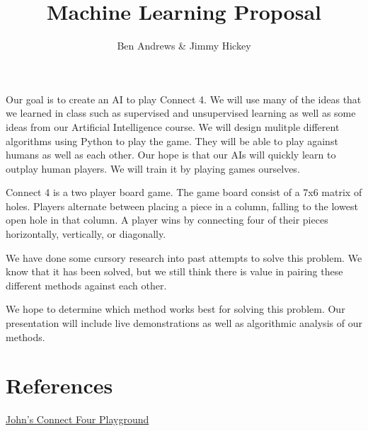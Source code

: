 \documentclass[]{article}
\title{Machine Learning Proposal}
\author{Ben Andrews \& Jimmy Hickey}
\begin{document}
	\maketitle

Our goal is to create an AI to play Connect 4. We will use many of the ideas that we learned in class such as supervised and unsupervised learning as well as some ideas from our Artificial Intelligence course. We will design mulitple different algorithms using Python to play the game. They will be able to play against humans as well as each other. Our hope is that our AIs will quickly learn to outplay human players. We will train it by playing games ourselves.

Connect 4 is a two player board game. The game board consist of a 7x6 matrix of holes. Players alternate between placing a piece in a column, falling to the lowest open hole in that column. A player wins by connecting four of their pieces horizontally, vertically, or diagonally. 

We have done some cursory research into past attempts to solve this problem. We know that it has been solved, but we still think there is value in pairing these different methods against each other.

We hope to determine which method works best for solving this problem. Our presentation will include live demonstrations as well as algorithmic analysis of our methods.

\section*{References}
\href{https://tromp.github.io/c4/c4.html}{John's Connect Four Playground}
\end{document}
